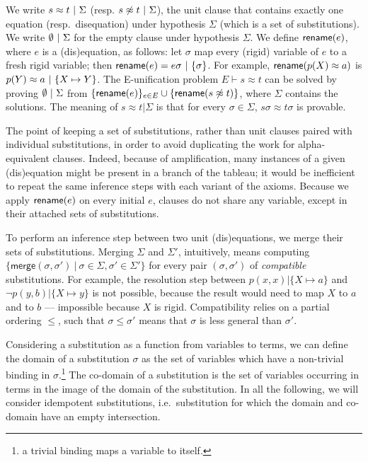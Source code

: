 We write $  s \approx t  ~|~  \Sigma$
(resp. $  s \not\approx t  ~|~  \Sigma$),
the unit clause that contains exactly one equation (resp.~disequation)
under hypothesis $\Sigma$ (which is a set of substitutions).
We write $\emptyset ~|~ \Sigma$ for the empty clause under hypothesis $\Sigma$.
We define $\textsf{rename}(e)$, where $e$ is a (dis)equation, as follows:
let $\sigma$ map every (rigid) variable of $e$ to a fresh rigid variable;
then $\textsf{rename}(e) =  e\sigma  ~|~  \{ \sigma \} $.
For example, $\textsf{rename}(p(X)\approx a)$
is $ p(Y)\approx a ~|~  \{ X\mapsto Y\} $. %
The E-unification problem $E \vdash s\approx t$ can be solved by
proving $\emptyset  ~|~  \Sigma$
from $\{ \textsf{rename}(e) \}_{ e \in E }
\cup
\{ \textsf{rename}( s \not\approx t ) \}$,
where $\Sigma$ contains the solutions.
The meaning of $s \approx t | \Sigma$ is that for every $\sigma \in \Sigma$,
$s\sigma \approx t\sigma$ is provable.

The point of keeping a set of substitutions, rather than unit clauses paired with
individual substitutions, in order to avoid duplicating the work
for alpha-equivalent clauses.
Indeed, because of amplification, many instances of a given (dis)equation
might be present in a branch of the tableau;
it would be inefficient to repeat the same inference steps with each variant
of the axioms.
Because we apply $\textsf{rename}(e)$ on every initial $e$, clauses do not
share any variable, except in their attached sets of substitutions.

To perform an inference step between two unit (dis)equations, we merge their
sets of substitutions.
Merging $\Sigma$ and $\Sigma'$, intuitively, means
computing $\{ \textsf{merge}(\sigma,\sigma') ~|~ \sigma \in \Sigma, \sigma'\in \Sigma' \}$
for every pair $(\sigma,\sigma')$ of {\em compatible} substitutions.
For example, the resolution step between $p(x,x)| \{ X \mapsto a \}$
and $\lnot p(y,b)| \{ X \mapsto y \}$ is not possible, because the result
would need to map $X$ to $a$ and to $b$  --- impossible because $X$ is rigid.
Compatibility relies on a partial ordering $\leq$,
such that $\sigma \leq \sigma'$ means that $\sigma$ is
less general than $\sigma'$.

Considering a substitution as a function from variables to terms, we can define
the domain of a substitution $\sigma$ as the set of variables which have a non-trivial
binding in $\sigma$.\footnote{a trivial binding maps a variable to itself.}
The co-domain of a substitution is the set of variables occurring in terms in the image of
the domain of the substitution.
In all the following, we will consider idempotent substitutions, i.e.~substitution for which
the domain and co-domain have an empty intersection.

